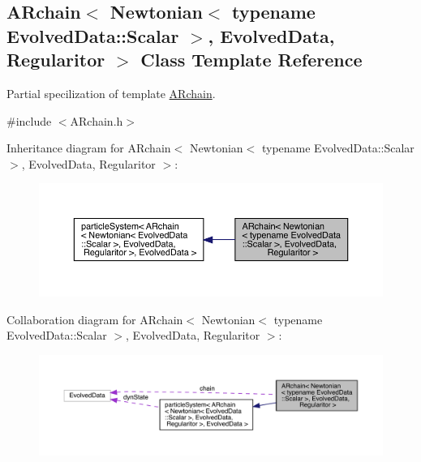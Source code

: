 \hypertarget{class_a_rchain_3_01_newtonian_3_01typename_01_evolved_data_1_1_scalar_01_4_00_01_evolved_data_00_01_regularitor_01_4}{}\subsection{A\+Rchain$<$ Newtonian$<$ typename Evolved\+Data\+:\+:Scalar $>$, Evolved\+Data, Regularitor $>$ Class Template Reference}
\label{class_a_rchain_3_01_newtonian_3_01typename_01_evolved_data_1_1_scalar_01_4_00_01_evolved_data_00_01_regularitor_01_4}


Partial specilization of template \mbox{\hyperlink{class_a_rchain}{A\+Rchain}}.  




{\ttfamily \#include $<$A\+Rchain.\+h$>$}



Inheritance diagram for A\+Rchain$<$ Newtonian$<$ typename Evolved\+Data\+:\+:Scalar $>$, Evolved\+Data, Regularitor $>$\+:\nopagebreak
\begin{figure}[H]
\begin{center}
\leavevmode
\includegraphics[width=350pt]{class_a_rchain_3_01_newtonian_3_01typename_01_evolved_data_1_1_scalar_01_4_00_01_evolved_data_009697bd28ff0e21ae1fe098221d830f5f}
\end{center}
\end{figure}


Collaboration diagram for A\+Rchain$<$ Newtonian$<$ typename Evolved\+Data\+:\+:Scalar $>$, Evolved\+Data, Regularitor $>$\+:\nopagebreak
\begin{figure}[H]
\begin{center}
\leavevmode
\includegraphics[width=350pt]{class_a_rchain_3_01_newtonian_3_01typename_01_evolved_data_1_1_scalar_01_4_00_01_evolved_data_0008f198c2eb8c667ccc6c16f5130b7c81}
\end{center}
\end{figure}
